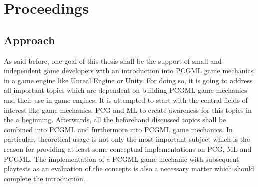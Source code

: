 \documentclass[MGS,Master,english]{twbook}%
\begin{document}
\section{Proceedings}
\subsection{Approach}
As said before, one goal of this thesis shall be the support of small and independent game developers with an introduction into PCGML game mechanics in a game engine like Unreal Engine or Unity. For doing so, it is going to address all important topics which are dependent on building PCGML game mechanics and their use in game engines. It is attempted to start with the central fields of interest like game mechanics, PCG and ML to create awareness for this topics in the a beginning. Afterwards, all the beforehand discussed topics shall be combined into PCGML and furthermore into PCGML game mechanics. In particular, theoretical usage is not only the most important subject which is the reason for providing at least some conceptual implementations on PCG, ML and PCGML. The implementation of a PCGML game mechanic with subsequent playtests as an evaluation of the concepts is also a necessary matter which should complete the introduction.
\end{document}
